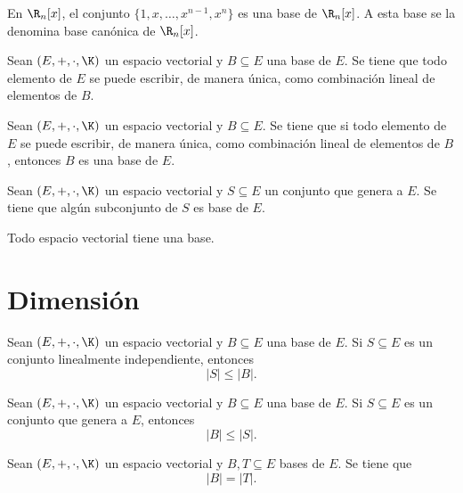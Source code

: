 \documentclass[a4,11pt]{aleph-notas}
\begin{document}
\begin{teo}
    En $\R_n[x]$, el conjunto $\{1,x,\ldots,x^{n-1},x^n\}$ es una base de $\R_n[x]$. A esta base se la denomina base canónica de $\R_n[x]$.
\end{teo}

\begin{teo}
    Sean $(E,+,\cdot,\K)$ un espacio vectorial y $B\subseteq E$ una base de $E$. Se tiene que todo elemento de $E$ se puede escribir, de manera única, como combinación lineal de elementos de $B$.
\end{teo}

\begin{teo}
    Sean $(E,+,\cdot,\K)$ un espacio vectorial y $B\subseteq E$. Se tiene que si todo elemento de $E$ se puede escribir, de manera única, como combinación lineal de elementos de $B$, entonces $B$ es una base de $E$.
\end{teo}


\begin{teo}
    Sean $(E,+,\cdot,\K)$ un espacio vectorial y $S\subseteq E$ un conjunto que genera a $E$. Se tiene que algún subconjunto de $S$ es base de $E$.
\end{teo}


\begin{teo}
    Todo espacio vectorial tiene una base.
\end{teo}

\section{Dimensión}


\begin{teo}
    Sean $(E,+,\cdot,\K)$ un espacio vectorial y $B\subseteq E$ una base de $E$. Si $S\subseteq E$ es un conjunto linealmente independiente, entonces 
    \[
        |S|\leq |B|.
    \]
\end{teo}

\begin{teo}
    Sean $(E,+,\cdot,\K)$ un espacio vectorial y $B\subseteq E$ una base de $E$. Si $S\subseteq E$ es un conjunto que genera a $E$, entonces 
    \[
        |B|\leq |S|.
    \]
\end{teo}


\begin{teo}
    Sean $(E,+,\cdot,\K)$ un espacio vectorial y $B,T\subseteq E$ bases de $E$. Se tiene que
    \[
        |B|=|T|.
    \]
\end{teo}
\end{document}
